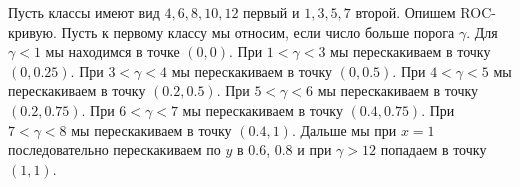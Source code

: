 Пусть классы имеют вид $4,6,8,10,12$ первый и $1,3,5,7$ второй. Опишем ROC-кривую. Пусть к первому классу мы относим, если число больше порога $\gamma$. Для $\gamma < 1$ мы находимся в точке $(0, 0)$. При $1 < \gamma < 3$ мы перескакиваем в точку $(0, 0.25)$. При $3 < \gamma < 4$ мы перескакиваем в точку $(0, 0.5)$. При $4 < \gamma < 5$ мы перескакиваем в точку $(0.2, 0.5)$. При $5 < \gamma < 6$ мы перескакиваем в точку $(0.2, 0.75)$.
При $6 < \gamma < 7$ мы перескакиваем в точку $(0.4, 0.75)$. При $7 < \gamma < 8$ мы перескакиваем в точку $(0.4, 1)$. Дальше мы при $x=1$ последовательно перескакиваем по $y$ в 0.6, 0.8 и при $\gamma >12$ попадаем в точку $(1,1)$.



%



	